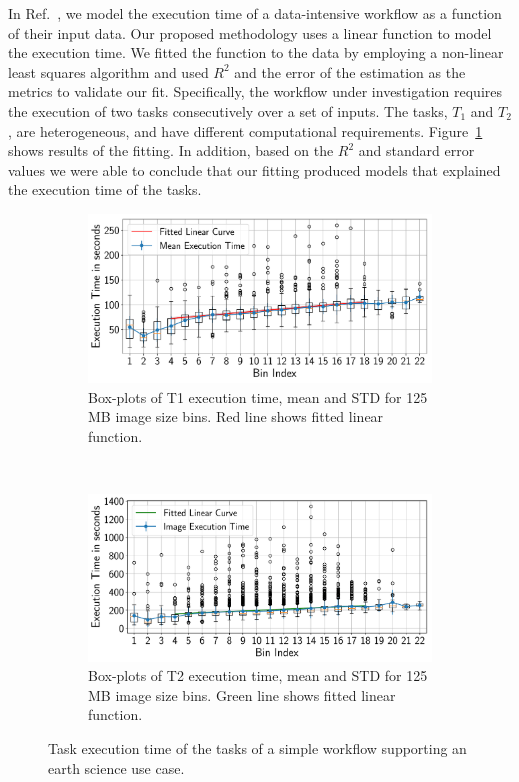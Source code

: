 In Ref.~\cite{paraskevakos2019workflow}, we model the execution time of a 
data-intensive workflow as a function of their input data. Our proposed 
methodology uses a linear function to model the execution time. We fitted the 
function to the data by employing a non-linear least squares algorithm and used 
$R^{2}$ and the error of the estimation as the metrics to validate our fit. 
Specifically, the workflow under investigation requires the execution of two 
tasks consecutively over a set of inputs. The tasks, $T_{1}$ and $T_{2}$, are 
heterogeneous, and have different computational requirements. 
Figure~\ref{fig:sealfitting} shows results of the fitting. In addition, based 
on the $R^{2}$ and standard error values we were able to conclude that our 
fitting produced models that explained the execution time of the tasks.

\begin{figure}[ht!]
    \centering
    \begin{subfigure}[b]{0.45\textwidth}
        \includegraphics[width=\linewidth]{figures/stage_0_tx_box.pdf}
        \caption{Box-plots of T1 execution time, mean and STD for 125 MB image 
        size bins. Red line shows fitted linear function.}
    \end{subfigure}%
    ~ 
    \begin{subfigure}[b]{0.45\textwidth}
        \includegraphics[width=\linewidth]{figures/stage_1_tx_box.pdf}
        \caption{Box-plots of T2 execution time, mean and STD for 125 MB image 
        size bins. Green line shows fitted linear function.}
    \end{subfigure}
    \caption{Task execution time of the tasks of a simple workflow supporting an 
    earth science use case.}
    \label{fig:sealfitting}
\end{figure}

